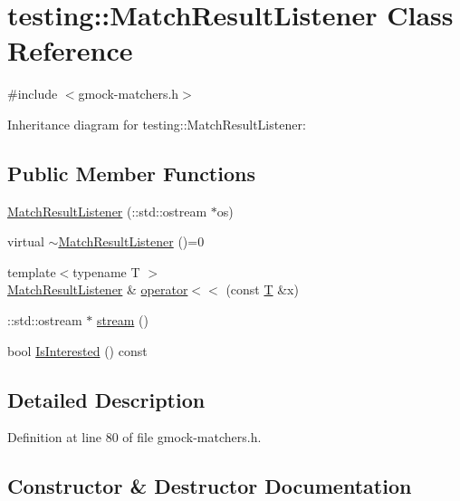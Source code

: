 \hypertarget{classtesting_1_1_match_result_listener}{}\section{testing\+:\+:Match\+Result\+Listener Class Reference}
\label{classtesting_1_1_match_result_listener}


{\ttfamily \#include $<$gmock-\/matchers.\+h$>$}



Inheritance diagram for testing\+:\+:Match\+Result\+Listener\+:
\subsection*{Public Member Functions}
\begin{DoxyCompactItemize}
\item 
\hyperlink{classtesting_1_1_match_result_listener_a245c360286cd0496d22a4d2fde80eb0b}{Match\+Result\+Listener} (\+::std\+::ostream $\ast$os)
\item 
virtual \hyperlink{classtesting_1_1_match_result_listener_aa29f43f7b2ffd850c721a8a33ccbba92}{$\sim$\+Match\+Result\+Listener} ()=0
\item 
{\footnotesize template$<$typename T $>$ }\\\hyperlink{classtesting_1_1_match_result_listener}{Match\+Result\+Listener} \& \hyperlink{classtesting_1_1_match_result_listener_a89f628a452635d1502a9062d9c864ebd}{operator$<$$<$} (const \hyperlink{functions__7_8js_adf1f3edb9115acb0a1e04209b7a9937b}{T} \&x)
\item 
\+::std\+::ostream $\ast$ \hyperlink{classtesting_1_1_match_result_listener_a5abecb247e005f7f50a94898e3f44ee3}{stream} ()
\item 
bool \hyperlink{classtesting_1_1_match_result_listener_a68dc4f2f3c3425f4d4dd90ab02244615}{Is\+Interested} () const 
\end{DoxyCompactItemize}


\subsection{Detailed Description}


Definition at line 80 of file gmock-\/matchers.\+h.



\subsection{Constructor \& Destructor Documentation}
